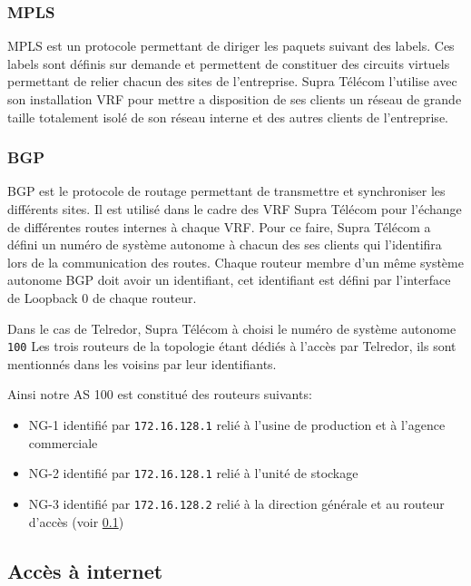 \documentclass{article}
\newcommand{\tlr}{Telredor\xspace}
\newcommand{\spr}{Supra Télécom\xspace}
\begin{document}
\subsubsection{MPLS}

MPLS est un protocole permettant de diriger les paquets suivant des labels.
Ces labels sont définis sur demande et permettent de constituer des circuits virtuels permettant de relier chacun des sites de l'entreprise.
\spr l'utilise avec son installation VRF pour mettre a disposition de ses clients un réseau de grande taille totalement isolé de son réseau interne et des autres clients de l'entreprise.

\subsubsection{BGP}

BGP est le protocole de routage permettant de transmettre et synchroniser les différents sites.
Il est utilisé dans le cadre des VRF \spr pour l'échange de différentes routes internes à chaque VRF.
Pour ce faire, \spr a défini un numéro de système autonome à chacun des ses clients qui l'identifira lors de la communication des routes.
Chaque routeur membre d'un même système autonome BGP doit avoir un identifiant, cet identifiant est défini par l'interface de Loopback 0 de chaque routeur.

Dans le cas de \tlr, \spr à choisi le numéro de système autonome \texttt{100}
Les trois routeurs de la topologie étant dédiés à l'accès par \tlr, ils sont mentionnés dans les voisins par leur identifiants.

Ainsi notre AS 100 est constitué des routeurs suivants:

\bigskip

\begin{itemize}
	\item NG-1 identifié par \texttt{172.16.128.1} relié à l'usine de production et à l'agence commerciale
	\item NG-2 identifié par \texttt{172.16.128.1} relié à l'unité de stockage
	\item NG-3 identifié par \texttt{172.16.128.2} relié à la direction générale et au routeur d'accès (voir \ref{acces-internet})
\end{itemize}

\bigskip

\subsection{Accès à internet}
\label{acces-internet}
\end{document}
